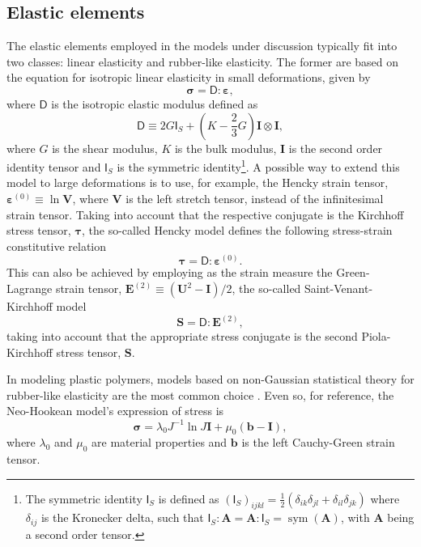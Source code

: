 \subsection{Elastic elements}

The elastic elements employed in the models under discussion typically fit into two classes: linear elasticity and rubber-like elasticity.
The former are based on the equation for isotropic linear elasticity in small deformations, given by
\begin{equation}
	\bm \sigma=\bm{\mathsf D}:\bm \varepsilon,
\end{equation}
where $\bm{\mathsf D}$ is the isotropic elastic modulus defined as
\begin{equation}
\bm{\mathsf D}\equiv 2 G \bm{\mathsf I}_S+\left(K-\frac{2}{3} G\right) \bm I \otimes \bm I ,
\end{equation}
where $G$ is the shear modulus, $K$ is the bulk modulus, $\bm I$ is the second order identity tensor and $\bm{\mathsf I}_S$ is the symmetric identity\footnote{The symmetric identity $\bm{\mathsf I}_S$ is defined as $(\bm{\mathsf I}_S)_{ijkl} =\frac{1}{2}(\delta_{ik}\delta_{jl} + \delta_{il}\delta_{jk})$ where $\delta_{ij}$ is the Kronecker delta, such that $\bm{\mathsf I}_S: \bm A = \bm A: \bm{\mathsf I}_S = \operatorname{sym} (\bm A)$, with $\bm A$ being a second order tensor.}.
A possible way to extend this model to large deformations is to use, for example, the Hencky strain tensor, $\bm \varepsilon^{(0)}\equiv \ln \bm V$, where $\bm V$ is the left stretch tensor, instead of the infinitesimal strain tensor.
Taking into account that the respective conjugate is the Kirchhoff stress tensor, $\bm \tau$, the so-called Hencky model defines the following stress-strain constitutive relation
\begin{equation}
	\label{eq:hencky_model}
	\pmb \tau=\bm{\mathsf D}:\bm \varepsilon^{(0)}.
\end{equation}
This can also be achieved by employing as the strain measure the Green-Lagrange strain tensor, $\bm E^{(2)}\equiv (\bm U^2 - \bm I)/2$, the so-called Saint-Venant-Kirchhoff model
\begin{equation}
	\label{eq:saint_venant_kirchhoff}
	\bm S = \bm{\mathsf D}: \bm E^{(2)},
\end{equation}
taking into account that the appropriate stress conjugate is the second Piola-Kirchhoff stress tensor, $\bm S$.

In modeling plastic polymers, models based on non-Gaussian statistical theory for rubber-like elasticity are the most common choice \citep{holzapfelNonlinearSolidMechanics2000}.
Even so, for reference, the Neo-Hookean model's expression of stress is
\begin{equation}
  \label{eq:neo_hookean_model}
	\bm \sigma = \lambda_0 J^{-1}\ln J \bm{I}+\mu_0\left(\bm{b}-\bm{I}\right),
\end{equation}
where $\lambda_0$ and $\mu_0$ are material properties and $\bm b$ is the left Cauchy-Green strain tensor.

